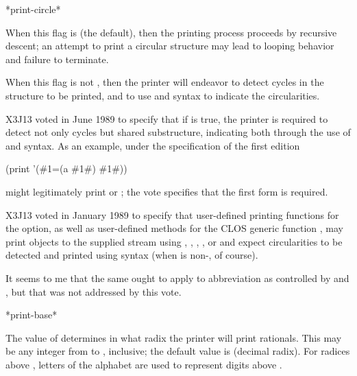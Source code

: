 \begin{defun}[Variable]
*print-circle*

When this flag is {\false} (the default), then the printing process proceeds
by recursive descent; an attempt to print a circular structure may lead
to looping behavior and failure to terminate.

\begin{obsolete}
When this flag is not {\false}, then the printer will endeavor to detect
cycles in the structure to be printed, and to use  and 
syntax to indicate the circularities.
\end{obsolete}

\begin{newer}
X3J13 voted in June 1989 
to specify that if  is true, the printer is required
to detect not only cycles but shared substructure, indicating both through the
use of  and  syntax.
As an example, under the specification of the first edition
\begin{lisp}
(print '(\#1=(a \#1\#) \#1\#))
\end{lisp}
might legitimately print  or
; the vote specifies that the first
form is required.
\end{newer}

\begin{new}
X3J13 voted in January 1989
to specify that user-defined printing functions for the 
 option, as well as user-defined methods for the
CLOS generic function , may print objects to the
supplied stream using , , , ,
or  and expect circularities to be detected and printed
using  syntax (when  is non-, of course).

It seems to me that the same ought to apply to abbreviation
as controlled by  and , but that
was not addressed by this vote.
\end{new}
\end{defun}

\begin{defun}[Variable]
*print-base*

The value of  determines in what radix the printer will print
rationals.  This may be any integer from  to , inclusive;
the default value is  (decimal radix).
For radices above , letters of the alphabet are used to represent
digits above .
\end{defun}

